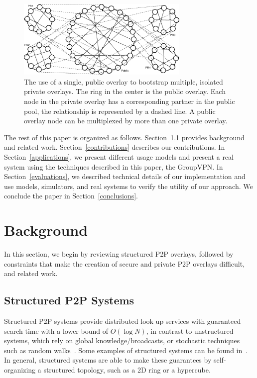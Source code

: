 \documentclass[conference]{IEEEtran}
\begin{document}
\begin{figure}[h]
\centering
\includegraphics[width=3.25in]{subrings.eps}
\caption{The use of a single, public overlay to bootstrap multiple, isolated
private overlays.  The ring in the center is the public overlay.  Each node in
the private overlay has a corresponding partner in the public pool, the
relationship is represented by a dashed line.  A public overlay node can be
multiplexed by more than one private overlay.}
\label{fig:subrings}
\end{figure}

The rest of this paper is organized as follows.  Section~\ref{structured_p2p}
provides background and related work.
Section~\ref{contributions} describes our contributions.  In
Section~\ref{applications}, we present different usage models and present a
real system using the techniques described in this paper, the GroupVPN.  In
Section~\ref{evaluations}, we described technical details of our implementation
and use models, simulators, and real systems to verify the utility of our
approach.  We conclude the paper in Section~\ref{conclusions}.

\section{Background}
\label{background}
In this section, we begin by reviewing structured P2P overlays, followed by
constraints that make the creation of secure and private P2P overlays
difficult, and related work.

\subsection{Structured P2P Systems}
\label{structured_p2p}
Structured P2P systems provide distributed look up services with guaranteed
search time with a lower bound of $O(\log N)$, in contrast to unstructured
systems, which rely on global knowledge/broadcasts, or stochastic techniques
such as random walks~\cite{unstructured_v_structured}.  Some examples of
structured systems can be found in~\cite{pastry, chord, symphony, kademlia,
can}.  In general, structured systems are able to make these guarantees by
self-organizing a structured topology, such as a 2D ring or a hypercube.
\end{document}
